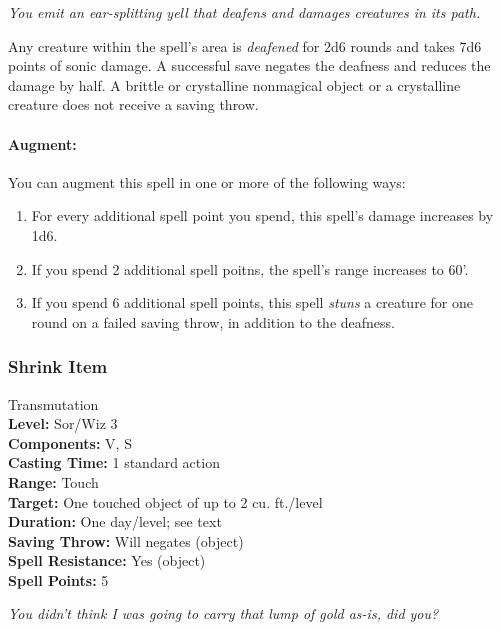\emph{You emit an ear-splitting yell that deafens and damages creatures in its path.}

Any creature within the spell's area is \emph{deafened} for 2d6 rounds and takes 7d6 points of sonic damage. 
A successful save negates the deafness and reduces the damage by half. 
A brittle or crystalline nonmagical object or a crystalline creature does not receive a saving throw.

\paragraph{Augment:} You can augment this spell in one or more of the following ways:
\begin{enumerate}
 \item For every additional spell point you spend, this spell's damage increases by 1d6.
 \item If you spend 2 additional spell poitns, the spell's range increases to 60'.
 \item If you spend 6 additional spell points, this spell \emph{stuns} a creature for one round on a failed saving throw, in addition to the deafness.
\end{enumerate}
\subsubsection{Shrink Item}
\label{Spell:ShrinkItem}
Transmutation
\\ \textbf{Level:} Sor/Wiz 3
\\ \textbf{Components:} V, S
\\ \textbf{Casting Time:} 1 standard action
\\ \textbf{Range:} Touch
\\ \textbf{Target:} One touched object of up to 2 cu. ft./level
\\ \textbf{Duration:} One day/level; see text
\\ \textbf{Saving Throw:} Will negates (object)
\\ \textbf{Spell Resistance:} Yes (object)
\\ \textbf{Spell Points:} 5

\emph{You didn't think I was going to carry that lump of gold as-is, did you?}


